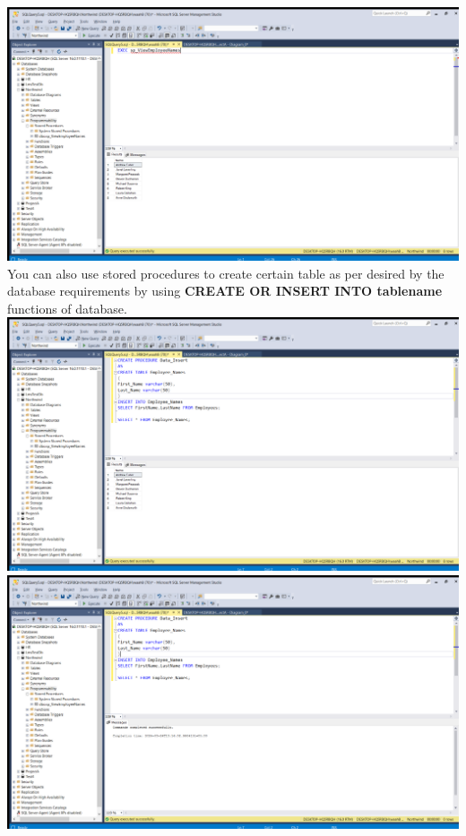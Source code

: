\documentclass{article}
\begin{document}
\begin{center}
    \includegraphics[width=1\textwidth]{5.png} \\
    \newpage
    You can also use stored procedures to create certain table as per desired by the database requirements by using \textbf{CREATE OR INSERT INTO tablename} functions of database.\\
    \includegraphics[width=1\textwidth]{6.png} \\
    \includegraphics[width=1\textwidth]{7.png} \\

\end{center}
\end{document}
